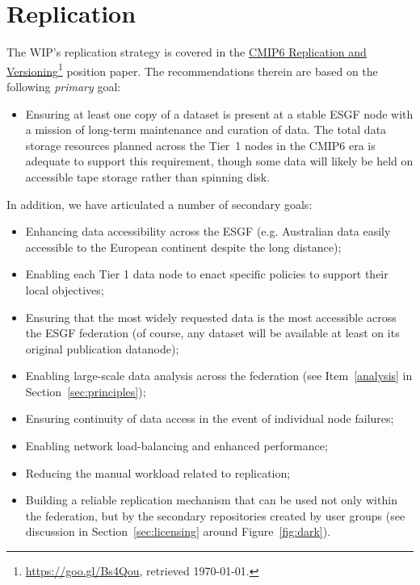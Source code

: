 \documentclass[gmd,manuscript]{copernicus}
\newcommand{\pllabel}[1]{\label{p-#1}\linelabel{l-#1}}
\newcommand{\urlref}[2] {\href{#1}{#2}\footnote{\url{#1}, retrieved \today.}}
\begin{document}
\section{Replication}
\label{sec:replica}

The WIP's replication strategy is covered in the
\urlref{https://goo.gl/Bs4Qou}{CMIP6 Replication and Versioning}
position paper. The recommendations therein are based on the following
\emph{primary} goal:

\begin{itemize}
\item Ensuring at least one copy of a dataset is present at a stable
  ESGF node with a mission of long-term maintenance and curation of
  data. The total data storage resources planned across the Tier~1
  nodes in the CMIP6 era is adequate to support this requirement,
  though some data will likely be held on accessible tape storage
  rather than spinning disk.
\end{itemize}

In addition, we have articulated a number of secondary goals:

\begin{itemize}
\item Enhancing data accessibility across the ESGF (e.g. Australian
  data easily accessible to the European continent despite the long
  distance);
\item Enabling each Tier 1 data node to enact specific policies to
  support their local objectives;
\item Ensuring that the most widely requested data is the most
  accessible across the ESGF federation
  \pllabel{RC1-58}
  (of course, any dataset will be available at least on its original
  publication datanode);
\item Enabling large-scale data analysis across the federation (see
  Item~\ref{analysis} in Section~\ref{sec:principles});
\item Ensuring continuity of data access in the event of individual
  node failures;
\item Enabling network load-balancing and enhanced performance;
\item Reducing the manual workload related to replication;
\item Building a reliable replication mechanism that can be used not
  only within the federation, but by the secondary repositories
  created by user groups (see discussion in
  Section~\ref{sec:licensing} around Figure~\ref{fig:dark}).
\end{itemize}
\end{document}

